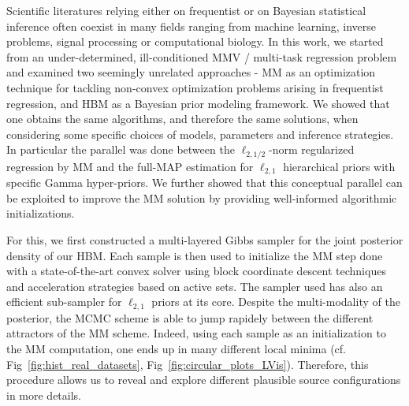 Scientific literatures relying either on frequentist or on Bayesian statistical inference often coexist in many fields ranging from machine learning, inverse problems, signal processing or computational biology.
In this work, we started from an under-determined, ill-conditioned MMV / multi-task regression problem and examined two seemingly unrelated approaches - MM as an optimization technique for tackling non-convex optimization problems arising in frequentist regression, and HBM as a Bayesian prior modeling framework. We showed that one obtains the same algorithms, and therefore the same solutions, when considering some specific choices of models, parameters and inference strategies. In particular the parallel was done between the $\ell_{2,1/2}$-norm regularized regression by MM and the full-MAP estimation for $\ell_{2,1}$ hierarchical priors with specific Gamma hyper-priors. We further showed that this conceptual parallel can be exploited to improve the MM solution by providing well-informed algorithmic initializations.



For this, we first constructed a multi-layered Gibbs sampler for the joint posterior density of our HBM.
Each sample is then used to initialize the MM step done with a state-of-the-art convex solver using block coordinate
descent techniques and acceleration strategies based on active sets. The sampler used has also an efficient sub-sampler for $\ell_{2,1}$ priors at its core. Despite the multi-modality of the posterior, the MCMC scheme is able to jump rapidely between the different attractors of the MM scheme. Indeed, using each sample as an initialization to the MM computation, one ends up in many different local minima (cf. Fig~\ref{fig:hist_real_datasets}, Fig~\ref{fig:circular_plots_LVis}). 
Therefore, this procedure allows us to reveal and explore different plausible source configurations in more details.
% 


